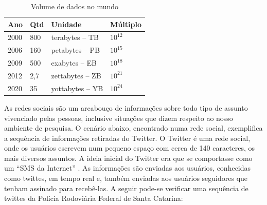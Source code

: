 \documentclass[conference,compsoc]{IEEEtran}
\begin{document}


\begin{table}[!ht]
\scriptsize
\centering
\caption{Volume de dados no mundo}
\begin{tabular}{|p{6mm}|p{5mm}|p{16mm}|p{8mm}|}
\hline
Ano & Qtd & Unidade & Múltiplo \\
\hline
2000 & 800 & terabytes – TB & $10^{12}$ \\ \hline

2006 & 160 & petabytes – PB & $10^{15}$ \\ \hline

2009 & 500 & exabytes – EB & $10^{18}$ \\ \hline

2012 & 2,7 & zettabytes – ZB & $10^{21}$ \\ \hline

2020 & 35 & yottabytes – YB & $10^{24}$ \\ \hline

\end{tabular}
\end{table}

As redes sociais são um arcabouço de informações sobre todo tipo de assunto vivenciado pelas pessoas, inclusive situações que dizem respeito ao nosso ambiente de pesquisa.
O cenário abaixo, encontrado numa rede social, exemplifica a sequência de informações retiradas do Twitter.
O Twitter é uma rede social, onde os usuários escrevem num pequeno espaço com cerca de 140 caracteres, os mais diversos assuntos. A ideia inicial do Twitter era que se comportasse como um ``SMS da Internet'' \cite{Twitter2015}. As informações são enviadas aos usuários, conhecidas como twittes, em tempo real e, também enviadas aos usuários seguidores que tenham assinado para recebê-las. A seguir pode-se verificar uma sequência de twittes da Polícia Rodoviária Federal de Santa Catarina:
\end{document}
